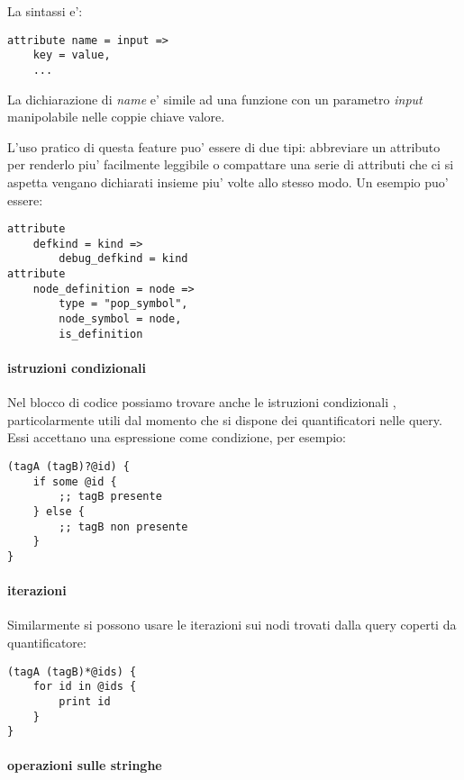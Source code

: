La sintassi e':

\begin{Verbatim}[samepage=true]
attribute name = input =>
    key = value,
    ...
\end{Verbatim}

La dichiarazione di \emph{name} e' simile ad una funzione con un parametro \emph{input} manipolabile nelle coppie chiave valore.

L'uso pratico di questa feature puo' essere di due tipi: abbreviare un attributo per renderlo piu' facilmente leggibile o compattare una serie di attributi che ci si aspetta vengano dichiarati insieme piu' volte allo stesso modo. Un esempio puo' essere:

\begin{Verbatim}[samepage=true]
attribute
    defkind = kind =>
        debug_defkind = kind
attribute
    node_definition = node =>
        type = "pop_symbol",
        node_symbol = node,
        is_definition
\end{Verbatim}

\paragraph{istruzioni condizionali}

Nel blocco di codice possiamo trovare anche le istruzioni condizionali \cite{TreeSitterGraphReferenceConditionals}, particolarmente utili dal momento che si dispone dei quantificatori nelle query.
Essi accettano una espressione come condizione, per esempio:

\begin{Verbatim}[samepage=true]
(tagA (tagB)?@id) {
    if some @id {
        ;; tagB presente
    } else {
        ;; tagB non presente
    }
}
\end{Verbatim}

\paragraph{iterazioni}

Similarmente si possono usare le iterazioni \cite{TreeSitterGraphReferenceListIterations} sui nodi trovati dalla query coperti da quantificatore:

\begin{Verbatim}[samepage=true]
(tagA (tagB)*@ids) {
    for id in @ids {
        print id
    }
}
\end{Verbatim}

\paragraph{operazioni sulle stringhe}

